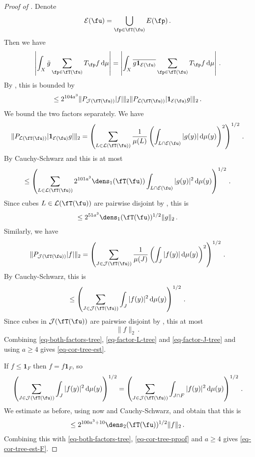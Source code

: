 \begin{proof}[Proof of ]
    Denote
    $$
        \mathcal{E}(\fu) = \bigcup_{\fp \in \fT(\fu)} E(\fp)\,.
    $$
    Then we have
    $$
        \left| \int_X \bar g \sum_{\fp \in \fT(\fu)} T_{\fp} f \, \mathrm{d}\mu \right| = \left| \int_X \overline{ g\mathbf{1}_{\mathcal{E}(\fu)}} \sum_{\fp \in \fT(\fu)} T_{\fp} f \, \mathrm{d}\mu \right|\,.
    $$
    By , this is bounded by
    \begin{equation}
        \label{eq-both-factors-tree}
        \le 2^{104a^3}\|P_{\mathcal{J}(\fT(\fu))}|f|\|_2 \|P_{\mathcal{L}(\fT(\fu))} |\mathbf{1}_{\mathcal{E}(\fu)}g|\|_2\,.
    \end{equation}
    We bound the two factors separately.
    We have
    $$
        \|P_{\mathcal{L}(\fT(\fu))} |\mathbf{1}_{\mathcal{E}(\fu)}g|\|_2 = \left( \sum_{L \in \mathcal{L}(\fT(\fu))} \frac{1}{\mu(L)} \left(\int_{L \cap \mathcal{E}(\fu)} |g(y)| \, \mathrm{d}\mu(y)\right)^2 \right)^{1/2}\,.
    $$
    By Cauchy-Schwarz and  this is at most
    $$
        \le \left( \sum_{L \in \mathcal{L}(\fT(\fu))} 2^{101a^3} \dens_1(\fT(\fu)) \int_{L \cap \mathcal{E}(\fu)} |g(y)|^2 \, \mathrm{d}\mu(y) \right)^{1/2}\,.
    $$
    Since cubes $L \in \mathcal{L}(\fT(\fu))$ are pairwise disjoint by , this is
    \begin{equation}
        \label{eq-factor-L-tree}
         \le 2^{51 a^3} \dens_1(\fT(\fu))^{1/2} \|g\|_2\,.
    \end{equation}
    Similarly, we have
    \begin{equation}
        \label{eq-cor-tree-proof}
        \|P_{\mathcal{J}(\fT(\fu))}|f|\|_2 = \left( \sum_{J \in \mathcal{J}(\fT(\fu))} \frac{1}{\mu(J)} \left(\int_J |f(y)| \, \mathrm{d}\mu(y)\right)^2 \right)^{1/2}\,.
    \end{equation}
    By Cauchy-Schwarz, this is
    $$
        \le \left( \sum_{J \in \mathcal{J}(\fT(\fu))} \int_J |f(y)|^2 \, \mathrm{d}\mu(y) \right)^{1/2}\,.
    $$
    Since cubes in $\mathcal{J}(\fT(\fu))$ are pairwise disjoint by , this at most
    \begin{equation}
        \label{eq-factor-J-tree}
        \|f\|_2\,.
    \end{equation}
    Combining \eqref{eq-both-factors-tree}, \eqref{eq-factor-L-tree} and \eqref{eq-factor-J-tree} and using $a \ge 4$ gives \eqref{eq-cor-tree-est}.

    If $f \le \mathbf{1}_F$ then $f = f\mathbf{1}_F$, so
    $$
        \left( \sum_{J \in \mathcal{J}(\fT(\fu))} \int_J |f(y)|^2 \, \mathrm{d}\mu(y) \right)^{1/2} = \left( \sum_{J \in \mathcal{J}(\fT(\fu))} \int_{J \cap F} |f(y)|^2 \, \mathrm{d}\mu(y) \right)^{1/2}\,.
    $$
    We estimate as before, using now  and Cauchy-Schwarz, and obtain that this is
    $$
        \le 2^{100a^3 + 10} \dens_2(\fT(\fu))^{1/2} \|f\|_2\,.
    $$
    Combining this with \eqref{eq-both-factors-tree}, \eqref{eq-cor-tree-proof} and $a \ge 4$ gives \eqref{eq-cor-tree-est-F}.
\end{proof}

